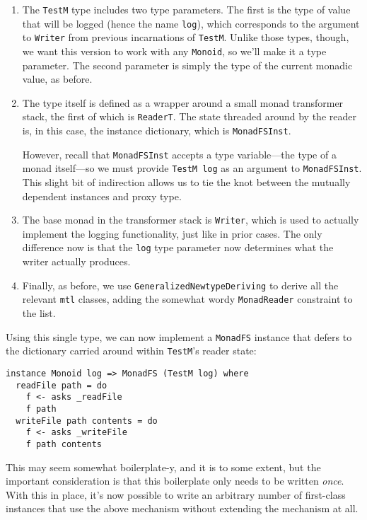 \begin{enumerate}
\item
  The \texttt{TestM} type includes two type parameters. The first is the
  type of value that will be logged (hence the name \texttt{log}), which
  corresponds to the argument to \texttt{Writer} from previous
  incarnations of \texttt{TestM}. Unlike those types, though, we want
  this version to work with any \texttt{Monoid}, so we'll make it a type
  parameter. The second parameter is simply the type of the current
  monadic value, as before.
\item
  The type itself is defined as a wrapper around a small monad
  transformer stack, the first of which is \texttt{ReaderT}. The state
  threaded around by the reader is, in this case, the instance
  dictionary, which is \texttt{MonadFSInst}.

  However, recall that \texttt{MonadFSInst} accepts a type
  variable---the type of a monad itself---so we must provide
  \texttt{TestM\ log} as an argument to \texttt{MonadFSInst}. This
  slight bit of indirection allows us to tie the knot between the
  mutually dependent instances and proxy type.
\item
  The base monad in the transformer stack is \texttt{Writer}, which is
  used to actually implement the logging functionality, just like in
  prior cases. The only difference now is that the \texttt{log} type
  parameter now determines what the writer actually produces.
\item
  Finally, as before, we use \texttt{GeneralizedNewtypeDeriving} to
  derive all the relevant \texttt{mtl} classes, adding the somewhat
  wordy \texttt{MonadReader} constraint to the list.
\end{enumerate}

Using this single type, we can now implement a \texttt{MonadFS} instance
that defers to the dictionary carried around within \texttt{TestM}'s
reader state:

\begin{verbatim}
instance Monoid log => MonadFS (TestM log) where
  readFile path = do
    f <- asks _readFile
    f path
  writeFile path contents = do
    f <- asks _writeFile
    f path contents
\end{verbatim}
This may seem somewhat boilerplate-y, and it is to some extent, but the
important consideration is that this boilerplate only needs to be
written \emph{once}. With this in place, it's now possible to write an
arbitrary number of first-class instances that use the above mechanism
without extending the mechanism at all.

